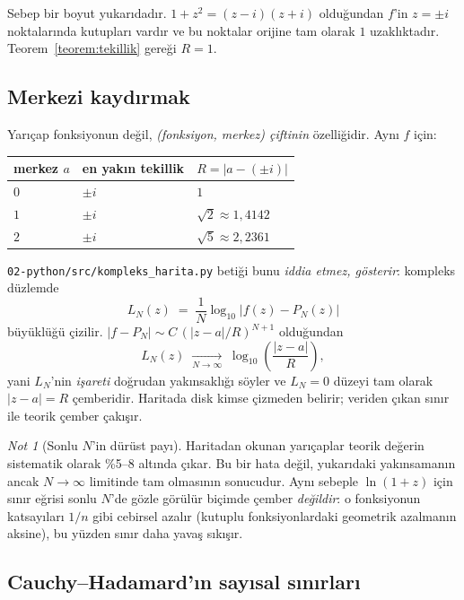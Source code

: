\documentclass[11pt,a4paper]{article}
\theoremstyle{plain}
\theoremstyle{definition}
\theoremstyle{remark}
\newtheorem*{notkutusu}{Not}
\begin{document}
Sebep bir boyut yukarıdadır. $1+z^2 = (z-i)(z+i)$ olduğundan $f$'in $z = \pm i$
noktalarında kutupları vardır ve bu noktalar orijine tam olarak $1$
uzaklıktadır. Teorem~\ref{teorem:tekillik} gereği $R = 1$.

\subsection*{Merkezi kaydırmak}

Yarıçap fonksiyonun değil, \emph{(fonksiyon, merkez) çiftinin} özelliğidir.
Aynı $f$ için:
\begin{center}
\begin{tabular}{lll}
\hline
merkez $a$ & en yakın tekillik & $R = |a - (\pm i)|$ \\
\hline
$0$   & $\pm i$ & $1$ \\
$1$   & $\pm i$ & $\sqrt{2} \approx 1{,}4142$ \\
$2$   & $\pm i$ & $\sqrt{5} \approx 2{,}2361$ \\
\hline
\end{tabular}
\end{center}

\texttt{02-python/src/kompleks\_harita.py} betiği bunu \emph{iddia etmez,
gösterir}: kompleks düzlemde
\[
  L_N(z) \;=\; \frac{1}{N}\log_{10}\bigl|f(z) - P_N(z)\bigr|
\]
büyüklüğü çizilir. $|f - P_N| \sim C\,(|z-a|/R)^{N+1}$ olduğundan
\[
  L_N(z) \;\xrightarrow[N\to\infty]{}\; \log_{10}\!\left(\frac{|z-a|}{R}\right),
\]
yani $L_N$'nin \emph{işareti} doğrudan yakınsaklığı söyler ve $L_N = 0$ düzeyi
tam olarak $|z-a| = R$ çemberidir. Haritada disk kimse çizmeden belirir;
veriden çıkan sınır ile teorik çember çakışır.

\begin{notkutusu}[Sonlu $N$'in dürüst payı]
Haritadan okunan yarıçaplar teorik değerin sistematik olarak \%5--8 altında
çıkar. Bu bir hata değil, yukarıdaki yakınsamanın ancak $N\to\infty$ limitinde
tam olmasının sonucudur. Aynı sebeple $\ln(1+z)$ için sınır eğrisi sonlu
$N$'de gözle görülür biçimde çember \emph{değildir}: o fonksiyonun katsayıları
$1/n$ gibi cebirsel azalır (kutuplu fonksiyonlardaki geometrik azalmanın
aksine), bu yüzden sınır daha yavaş sıkışır.
\end{notkutusu}

\subsection*{Cauchy--Hadamard'ın sayısal sınırları}
\end{document}
